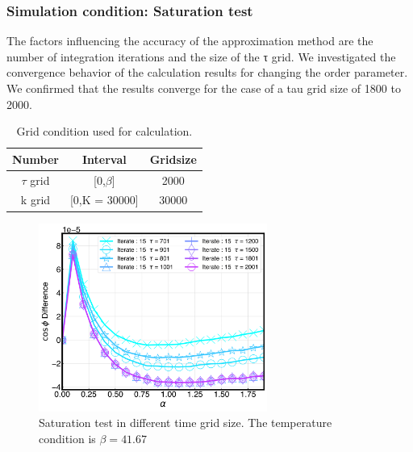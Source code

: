 \documentclass{article}[12pt]
\begin{document}
\begin{spacing}{1.3}
\subsubsection*{Simulation condition: Saturation test}
The factors influencing the accuracy of the approximation method are the number of integration iterations and the size of the τ grid.
We investigated the convergence behavior of the calculation results for changing the order parameter. 
We confirmed that the results converge for the case of a tau grid size of 1800 to 2000. 
\begin{table}[htbp]
  \centering
  \renewcommand{\arraystretch}{1.2}  %
  \begin{tabular}{@{}ccc@{}}
  \toprule
  \textbf{Number} & \textbf{Interval} & \textbf{Gridsize}\\ 
  \midrule
  $\tau$ grid & [0,$\beta$] & 2000 \\
  k grid & [0,K = 30000] & 30000 \\
  \bottomrule
  \end{tabular}
  \caption{Grid condition used for calculation.}
  \end{table}
\begin{figure}[htbp]
  \centerline{\includegraphics[width=7.5cm]{TexFigure/4/4_2_01_saturation.png}}
  \caption{Saturation test in different time grid size. The temperature condition is $\beta = 41.67$}
\end{figure}
\pagebreak

\end{spacing}
\end{document}
